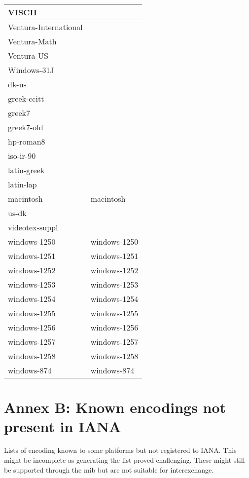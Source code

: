 \documentclass{wg21}
\begin{document}
\begin{longtable}{| p{} | p{} |}
VISCII & \\ \hline
Ventura-International & \\ \hline
Ventura-Math & \\ \hline
Ventura-US & \\ \hline
Windows-31J & \\ \hline
dk-us & \\ \hline
greek-ccitt & \\ \hline
greek7 & \\ \hline
greek7-old & \\ \hline
hp-roman8 & \\ \hline
iso-ir-90 & \\ \hline
latin-greek & \\ \hline
latin-lap & \\ \hline
macintosh & macintosh\\ \hline
us-dk & \\ \hline
videotex-suppl & \\ \hline
windows-1250 & windows-1250\\ \hline
windows-1251 & windows-1251\\ \hline
windows-1252 & windows-1252\\ \hline
windows-1253 & windows-1253\\ \hline
windows-1254 & windows-1254\\ \hline
windows-1255 & windows-1255\\ \hline
windows-1256 & windows-1256\\ \hline
windows-1257 & windows-1257\\ \hline
windows-1258 & windows-1258\\ \hline
windows-874 & windows-874\\ \hline
\end{longtable}

\section{Annex B: Known encodings not present in IANA}

Lists of encoding known to some platforms but not registered to IANA.
This might be incomplete as generating the list proved challenging.
These might still be supported through the  mib but are not
suitable for interexchange.
\end{document}
